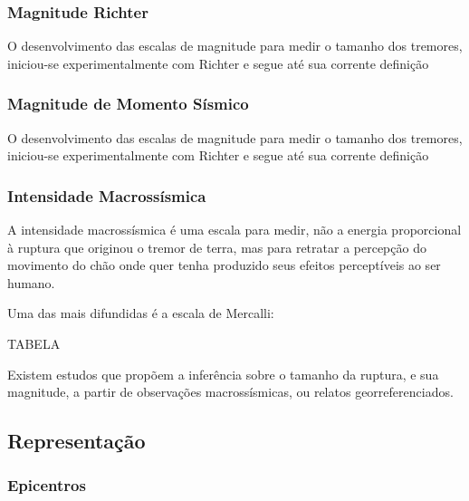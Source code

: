 \subsubsection{Magnitude Richter }
\label{sec:risco_sismico}

O desenvolvimento das escalas de magnitude para medir o tamanho dos tremores,
iniciou-se experimentalmente com Richter e segue até sua corrente definição


\subsubsection{Magnitude de Momento Sísmico }
\label{sec:risco_sismico}

O desenvolvimento das escalas de magnitude para medir o tamanho dos tremores,
iniciou-se experimentalmente com Richter e segue até sua corrente definição





\subsubsection{Intensidade Macrossísmica}
\label{sec:risco_sismico}


A intensidade macrossísmica é uma escala para medir, não a energia proporcional
à ruptura que originou o tremor de terra, mas para retratar a percepção do
movimento do chão onde quer tenha produzido seus efeitos perceptíveis ao ser
humano.

Uma das mais difundidas é a escala de Mercalli:


TABELA


Existem estudos que propõem a inferência sobre o tamanho da ruptura, e sua
magnitude, a partir de observações macrossísmicas, ou relatos georreferenciados.






\subsection{Representação}
\label{sec:fundamentos}


\subsubsection{Epicentros}
\label{sec:fundamentos}

